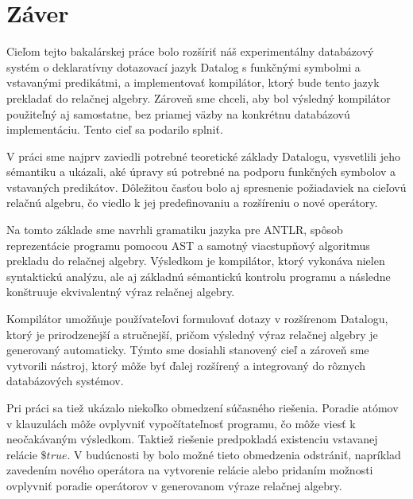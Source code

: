 \chapter*{Záver}

Cieľom tejto bakalárskej práce bolo rozšíriť náš experimentálny databázový systém o deklaratívny
dotazovací jazyk Datalog s funkčnými symbolmi a vstavanými predikátmi, a implementovať kompilátor,
ktorý bude tento jazyk prekladať do relačnej algebry. Zároveň sme chceli, aby bol výsledný
kompilátor použiteľný aj samostatne, bez priamej väzby na konkrétnu databázovú implementáciu. Tento
cieľ sa podarilo splniť.

V práci sme najprv zaviedli potrebné teoretické základy Datalogu, vysvetlili jeho sémantiku a
ukázali, aké úpravy sú potrebné na podporu funkčných symbolov a vstavaných predikátov. Dôležitou
časťou bolo aj spresnenie požiadaviek na cieľovú relačnú algebru, čo viedlo k jej predefinovaniu a
rozšíreniu o nové operátory. 

Na tomto základe sme navrhli gramatiku jazyka pre ANTLR, spôsob reprezentácie programu pomocou AST a
samotný viacstupňový algoritmus prekladu do relačnej algebry. Výsledkom je kompilátor, ktorý vykonáva
nielen syntaktickú analýzu, ale aj základnú sémantickú kontrolu programu a následne konštruuje
ekvivalentný výraz relačnej algebry.

Kompilátor umožňuje používateľovi formulovať dotazy v rozšírenom Datalogu, ktorý je prirodzenejší a
stručnejší, pričom výsledný výraz relačnej algebry je generovaný automaticky. Týmto sme dosiahli
stanovený cieľ a zároveň sme vytvorili nástroj, ktorý môže byť ďalej rozšírený a integrovaný do
rôznych databázových systémov.

Pri práci sa tiež ukázalo niekoľko obmedzení súčasného riešenia. Poradie atómov v klauzulách môže
ovplyvniť vypočítateľnosť programu, čo môže viesť k neočakávaným výsledkom. Taktiež riešenie
predpokladá existenciu vstavanej relácie $\$true$. V budúcnosti by bolo možné tieto obmedzenia
odstrániť, napríklad zavedením nového operátora na vytvorenie relácie alebo pridaním možnosti
ovplyvniť poradie operátorov v generovanom výraze relačnej algebry.


